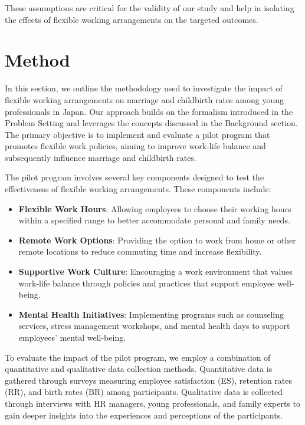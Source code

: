 \documentclass{article} %
\begin{document}
These assumptions are critical for the validity of our study and help in isolating the effects of flexible working arrangements on the targeted outcomes.

\section{Method}
\label{sec:method}

In this section, we outline the methodology used to investigate the impact of flexible working arrangements on marriage and childbirth rates among young professionals in Japan. Our approach builds on the formalism introduced in the Problem Setting and leverages the concepts discussed in the Background section. The primary objective is to implement and evaluate a pilot program that promotes flexible work policies, aiming to improve work-life balance and subsequently influence marriage and childbirth rates.

The pilot program involves several key components designed to test the effectiveness of flexible working arrangements. These components include:
\begin{itemize}
    \item \textbf{Flexible Work Hours}: Allowing employees to choose their working hours within a specified range to better accommodate personal and family needs.
    \item \textbf{Remote Work Options}: Providing the option to work from home or other remote locations to reduce commuting time and increase flexibility.
    \item \textbf{Supportive Work Culture}: Encouraging a work environment that values work-life balance through policies and practices that support employee well-being.
    \item \textbf{Mental Health Initiatives}: Implementing programs such as counseling services, stress management workshops, and mental health days to support employees' mental well-being.
\end{itemize}

To evaluate the impact of the pilot program, we employ a combination of quantitative and qualitative data collection methods. Quantitative data is gathered through surveys measuring employee satisfaction (ES), retention rates (RR), and birth rates (BR) among participants. Qualitative data is collected through interviews with HR managers, young professionals, and family experts to gain deeper insights into the experiences and perceptions of the participants.
\end{document}
